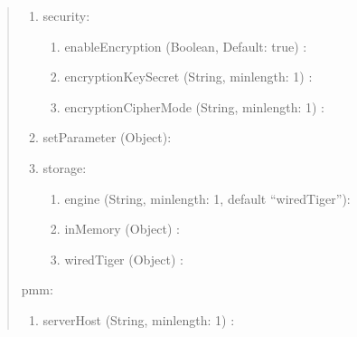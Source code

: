 \documentclass[letterpaper,10pt,english]{sphinxmanual}
\begin{document}
\begin{quote}
\begin{enumerate}
\begin{enumerate}
\item {} 
hostPort (Integer, min\sphinxhyphen{}value: 0) : 

\end{enumerate}

\item {} 
security:
\begin{enumerate}
%
\item {} 
enableEncryption (Boolean, Default: true) : 

\item {} 
encryptionKeySecret (String, min\sphinxhyphen{}length: 1) : 

\item {} 
encryptionCipherMode (String, min\sphinxhyphen{}length: 1) : 

\end{enumerate}

\item {} 
setParameter (Object): 

\item {} 
storage:
\begin{enumerate}
%
\item {} 
engine (String, min\sphinxhyphen{}length: 1, default “wiredTiger”): 

\item {} 
inMemory (Object) : 

\item {} 
wiredTiger (Object) : 

\end{enumerate}

\end{enumerate}

pmm:
\begin{enumerate}
%
\item {} 
serverHost (String, min\sphinxhyphen{}length: 1) : 


\end{enumerate}
\end{quote}
\end{document}
